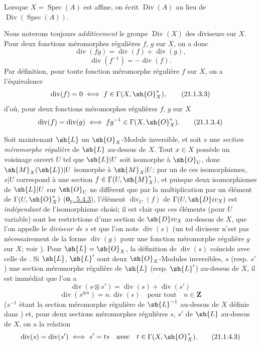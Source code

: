 Lorsque $X=\operatorname{Spec}(A)$ est affine, on écrit $\operatorname{Div}(A)$ au lieu de $\operatorname{Div}(\operatorname{Spec}(A))$.

\begin{env}[21.1.3]
\label{IV.21.1.3}
Nous noterons toujours \emph{additivement} le groupe $\operatorname{Div}(X)$ des diviseurs sur $X$.
Pour deux fonctions méromorphes régulières $f$, $g$ sur $X$, on a donc
\[
\label{IV.21.1.3.1}
  \operatorname{div}(fg)=\operatorname{div}(f)+\operatorname{div}(g),
  \tag{21.1.3.1}
\]
\[
\label{IV.21.1.3.2}
  \operatorname{div}(f^{-1})=-\operatorname{div}(f).
  \tag{21.1.3.2}
\]
Par définition, pour toute fonction méromorphe régulière $f$ sur $X$, on a l'équivalence
\[
\label{IV.21.1.3.3}
  \operatorname{div}(f)=0 \iff f\in\Gamma(X,\sh{O}_X^*),
  \tag{21.1.3.3}
\]
d'où, pour deux fonctions méromorphes régulières $f$, $g$ sur $X$
\[
\label{IV.21.1.3.4}
  \operatorname{div}(f)=\operatorname{div}(g) \iff fg^{-1}\in\Gamma(X,\sh{O}_X^*).
  \tag{21.1.3.4}
\]
\end{env}

\begin{env}[21.1.4]
Soit maintenant $\sh{L}$ un $\sh{O}_X$-Module inversible, et soit $s$ une \emph{section méromorphe régulière}  de $\sh{L}$ au-dessus de $X$.
Tout $x\in X$ possède un voisinage ouvert $U$ tel que $\sh{L}|U$ soit isomorphe à $\sh{O}_U$, donc $\sh{M}_X(\sh{L})|U$ isomorphe à $\sh{M}_X|U$;
par un de ces isomorphismes, $s|U$ correspond à une section $f\in\Gamma(U,\sh{M}_X^*)$, et puisque deux isomorphismes de $\sh{L}|U$ sur $\sh{O}_U$ ne diffèrent que par la multiplication par un élément de $\Gamma(U,\sh{O}_X^*)$ (\hyperref[0.5.4.3]{$\mathbf{0}_{\mathrm I}$, 5.4.3}), l'élément $\operatorname{div}_U(f)$ de $\Gamma(U,\sh{D}iv_X)$ est \emph{indépendant} de l'isomorphisme choisi;
il est clair que ces éléments (pour $U$ variable) sont les restrictions d'une section de $\sh{D}iv_X$ au-dessus de $X$, que l'on appelle le \emph{diviseur de $s$} et que l'on note $\operatorname{div}(s)$ (un tel diviseur n'est pas nécessairement de la forme $\operatorname{div}(g)$ pour une fonction méromorphe régulière $g$ sur $X$; voir ).
Pour $\sh{L}=\sh{O}_X$, la définition de $\operatorname{div}(s)$ coïncide avec celle de .
Si $\sh{L}$, $\sh{L}'$ sont deux $\sh{O}_X$-Modules inversibles, $s$ (resp. $s'$) une section méromorphe régulière de $\sh{L}$ (resp. $\sh{L}'$) au-dessus de $X$, il est immédiat que l'on a
\[
\label{IV.21.1.4.1}
  \operatorname{div}(s\otimes s')=\operatorname{div}(s)+\operatorname{div}(s')
  \tag{21.1.4.1}
\]
\[
\label{IV.21.1.4.2}
  \operatorname{div}(s^{\otimes n})=n.\operatorname{div}(s) \quad\text{pour tout}\quad n\in\mathbf{Z}
  \tag{21.1.4.2}
\]
($s^{-1}$ étant la section méromorphe régulière de $\sh{L}^{-1}$ au-dessus de $X$ définie dans )
et, pour deux sections méromorphes régulières $s$, $s'$ de $\sh{L}$ au-dessus de $X$, on a la relation
\[
\label{IV.21.1.4.3}
  \operatorname{div}(s)=\operatorname{div}(s') \iff s'=ts \quad\text{avec}\quad t\in\Gamma(X,\sh{O}_X^*).
  \tag{21.1.4.3}
\]
\end{env}

